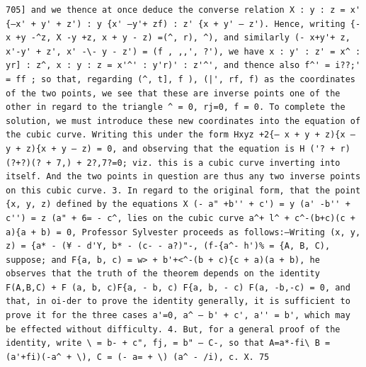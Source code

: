 \documentclass[11pt,a4paper]{book}
\begin{document}
\newpage
\setcounter{page}{593}
\begin{verbatim}
705] and we thence at once deduce the converse relation X : y : z = x' {—x' + y' + z') : y {x' —y'+ zf) : z' {x + y' — z'). Hence, writing {-x +y -^z, X -y +z, x + y - z) =(^, r), ^), and similarly (- x+y'+ z, x'-y' + z', x' -\- y - z') = (f , ,,', ?'), we have x : y' : z' = x^ : yr] : z^, x : y : z = x'^' : y'r)' : z'^', and thence also f^' = i??;' = ff ; so that, regarding (^, t], f ), (|', rf, f) as the coordinates of the two points, we see that these are inverse points one of the other in regard to the triangle ^ = 0, rj=0, f = 0. To complete the solution, we must introduce these new coordinates into the equation of the cubic curve. Writing this under the form Hxyz +2{— x + y + z){x — y + z){x + y — z) = 0, and observing that the equation is H ('? + r) (?+?)(? + 7,) + 2?,7?=0; viz. this is a cubic curve inverting into itself. And the two points in question are thus any two inverse points on this cubic curve. 3. In regard to the original form, that the point {x, y, z) defined by the equations X (- a" +b'' + c') = y (a' -b'' + c'') = z (a" + 6= - c^, lies on the cubic curve a^+ l^ + c^-(b+c)(c + a){a + b) = 0, Professor Sylvester proceeds as follows:—Writing (x, y, z) = {a* - (¥ - d'Y, b* - (c- - a?)"-, (f-{a^- h')% = {A, B, C), suppose; and F{a, b, c) = w> + b'+<^-(b + c){c + a)(a + b), he observes that the truth of the theorem depends on the identity F(A,B,C) + F (a, b, c)F{a, - b, c) F{a, b, - c) F(a, -b,-c) = 0, and that, in oi-der to prove the identity generally, it is sufficient to prove it for the three cases a'=0, a^ — b' + c', a'' = b', which may be effected without difficulty. 4. But, for a general proof of the identity, write \ = b- + c", fj, = b" — C-, so that A=a*-fi\ B = (a'+fi)(-a^ + \), C = (- a= + \) (a^ - /i), c. X. 75 
\end{verbatim}
\end{document}
